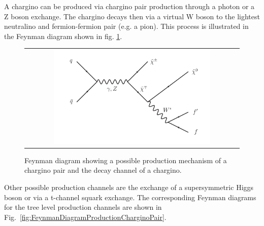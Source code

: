 A chargino can be produced via chargino pair production through a photon or a Z boson exchange. The chargino decays then via a virtual W boson to the lightest neutralino and fermion-fermion pair (e.g. a pion).
This process is illustrated in the Feynman diagram shown in fig. \ref{fig:FeynmanDiagram}.

\begin{figure}[!tb]
  \centering 
  \begin{tabular}{c}
    \includegraphics[width=0.75\textwidth]{figures/analysis/ChiChi_ProductionAndDecay.pdf}
  \end{tabular}
  \caption{Feynman diagram showing a possible production mechanism of a chargino pair and the decay channel of a chargino.}
  \label{fig:FeynmanDiagram}
\end{figure}

Other possible production channels are the exchange of a supersymmetric Higgs boson or via a t-channel squark exchange. 
The corresponding Feynman diagrams for the tree level production channels are shown in Fig.~\ref{fig:FeynmanDiagramProductionCharginoPair}.

